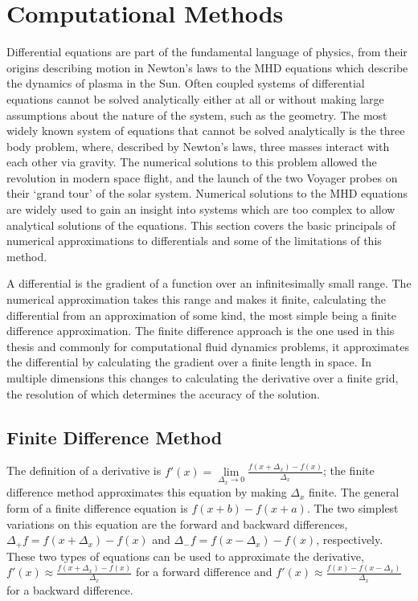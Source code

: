 \documentclass[a4paper,12pt,fourier,authoryear,custommargin]{Classes/PhDThesisPSnPDF}
\begin{document}
\section{Computational Methods}\label{sec:numericalmethods}
Differential equations are part of the fundamental language of physics, from their origins describing motion in Newton's laws to the MHD equations which describe the dynamics of plasma in the Sun. 
Often coupled systems of differential equations cannot be solved analytically either at all or without making large assumptions about the nature of the system, such as the geometry.
The most widely known system of equations that cannot be solved analytically is the three body problem, where, described by Newton's laws, three masses interact with each other via gravity.
The numerical solutions to this problem allowed the revolution in modern space flight, and the launch of the two Voyager probes on their `grand tour' of the solar system.
Numerical solutions to the MHD equations are widely used to gain an insight into systems which are too complex to allow analytical solutions of the equations.
This section covers the basic principals of numerical approximations to differentials and some of the limitations of this method.

A differential is the gradient of a function over an infinitesimally small range.
The numerical approximation takes this range and makes it finite, calculating the differential from an approximation of some kind, the most simple being a finite difference approximation.
The finite difference approach is the one used in this thesis and commonly for computational fluid dynamics problems, it approximates the differential by calculating the gradient over a finite length in space.
In multiple dimensions this changes to calculating the derivative over a finite grid, the resolution of which determines the accuracy of the solution.




\subsection{Finite Difference Method}

The definition of a derivative is $f'(x)=\lim\limits _{\Delta_{x}\to0}\frac{f(x+\Delta_{x})-f(x)}{\Delta_{x}}$; the finite difference method approximates this equation by making $\Delta_{x}$ finite.
The general form of a finite difference equation is $f(x+b)-f(x+a)$. The two simplest variations on this equation are the forward and backward differences, $\Delta_{+}f=f(x+\Delta_x)-f(x)$ and $\Delta_{-}f=f(x-\Delta_x)-f(x)$, respectively.
These two types of equations can be used to approximate the derivative, $f'(x)\approx\frac{f(x+\Delta_{x})-f(x)}{\Delta_{x}}$ for a forward difference and $f'(x)\approx\frac{f(x)-f(x-\Delta_{x})}{\Delta_{x}}$ for a backward difference.
\end{document}
